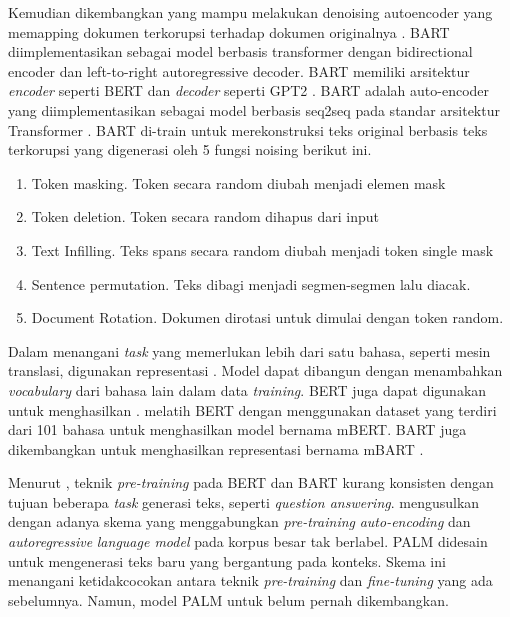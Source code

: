 Kemudian dikembangkan  yang mampu melakukan denoising autoencoder yang memapping dokumen terkorupsi terhadap dokumen originalnya .
\gls{BART} diimplementasikan sebagai model berbasis transformer dengan bidirectional encoder dan left-to-right autoregressive decoder.
\gls{BART} memiliki arsitektur \textit{encoder} seperti \gls{BERT}  dan \textit{decoder} seperti \gls{GPT2} .
\gls{BART}  adalah auto-encoder yang diimplementasikan sebagai model berbasis \gls{seq2seq} pada standar arsitektur Transformer .
\gls{BART} di-train untuk merekonstruksi teks original berbasis teks terkorupsi yang digenerasi oleh 5 fungsi noising berikut ini.
\begin{enumerate}
  \item Token masking.
  Token secara random diubah menjadi elemen mask
  \item Token deletion.
  Token secara random dihapus dari input
  \item Text Infilling.
  Teks spans secara random diubah menjadi token single mask
  \item Sentence permutation.
  Teks dibagi menjadi segmen-segmen lalu diacak.
  \item Document Rotation.
  Dokumen dirotasi untuk dimulai dengan token random.
\end{enumerate}


Dalam menangani \textit{task} yang memerlukan lebih dari satu bahasa, seperti mesin translasi, digunakan representasi \mwordem{}.
Model \multil{} dapat dibangun dengan menambahkan \textit{vocabulary} dari bahasa lain dalam data \textit{training}.
\gls{BERT} juga dapat digunakan untuk menghasilkan \mwordem{}.
\textcite{devlin2019} melatih \gls{BERT} dengan menggunakan dataset yang terdiri dari 101 bahasa untuk menghasilkan \multil{} model bernama mBERT.
\gls{BART} juga dikembangkan untuk menghasilkan representasi \mwordem{} bernama mBART .

Menurut \textcite{bi2020}, teknik \textit{pre-training} pada \gls{BERT} dan \gls{BART} kurang konsisten dengan tujuan beberapa \textit{task} generasi teks, seperti \textit{question answering}.
\textcite{bi2020} mengusulkan  dengan adanya skema yang menggabungkan \textit{pre-training} \textit{auto-encoding} dan \textit{autoregressive} \textit{language model} pada korpus besar tak berlabel.
\gls{PALM} didesain untuk mengenerasi teks baru yang bergantung pada konteks.
Skema ini menangani ketidakcocokan antara teknik \textit{pre-training} dan \textit{fine-tuning} yang ada sebelumnya.
Namun, model \gls{PALM} untuk \mwordem{} belum pernah dikembangkan.
